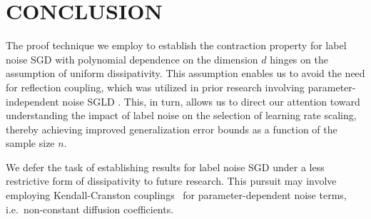 \documentclass{article}
\begin{document}
\section{CONCLUSION}

The proof technique we employ to establish the contraction property for label noise SGD with polynomial dependence on the dimension $d$ hinges on the assumption of uniform dissipativity. This assumption enables us to avoid the need for reflection coupling, which was utilized in prior research involving parameter-independent noise SGLD \citep{Farghly}. This, in turn, allows us to direct our attention toward understanding the impact of label noise on the selection of learning rate scaling, thereby achieving improved generalization error bounds as a function of the sample size $n$.

We defer the task of establishing results for label noise SGD under a less restrictive form of dissipativity to future research. This pursuit may involve employing Kendall-Cranston couplings~\citep{kendall1986nonnegative, cranston1991gradient} for parameter-dependent noise terms, i.e.\ non-constant diffusion coefficients.
\end{document}
